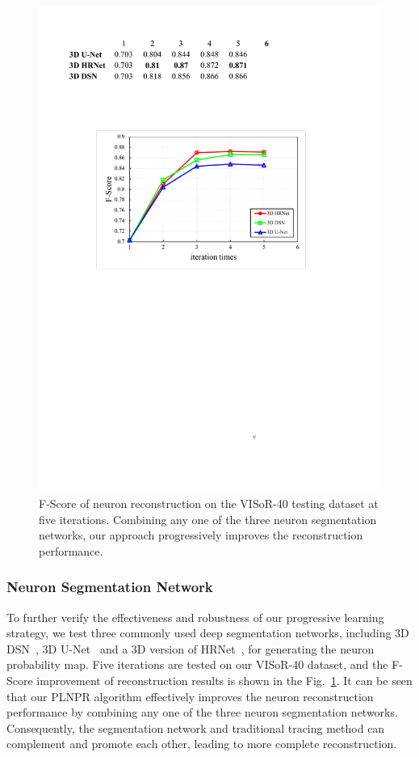 \begin{figure}[t]
	\centering
	\includegraphics[width=0.8\columnwidth]{./Illustrations/trace_networks_fscore11.pdf}
	\caption{F-Score of neuron reconstruction on the VISoR-40 testing dataset at five iterations. Combining any one of the three neuron segmentation networks, our approach progressively improves the reconstruction performance.}
	\label{fig:fscore_DNNs}
\end{figure}



\subsubsection{Neuron Segmentation Network}

To further verify the effectiveness and robustness of our progressive learning strategy, we test three commonly used deep segmentation networks, including 3D DSN~\cite{Dou2017}, 3D U-Net~\cite{Cicek2016} and a 3D version of HRNet~\cite{Sun2019}, for generating the neuron probability map.
Five iterations are tested on our VISoR-40 dataset, and the F-Score improvement of reconstruction results is shown in the Fig.~\ref{fig:fscore_DNNs}. 
%
It can be seen that our PLNPR algorithm effectively improves the neuron reconstruction performance by combining any one of the three neuron segmentation networks.
Consequently, the segmentation network and traditional tracing method can complement and promote each other, leading to more complete reconstruction.


